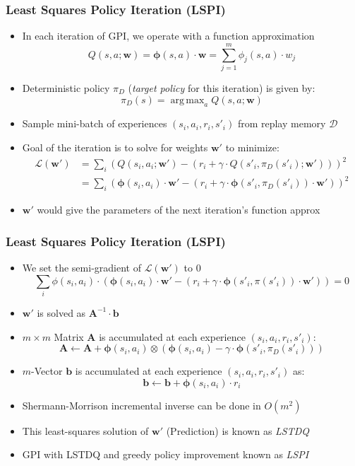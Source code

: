 \documentclass[handout]{beamer}
\DeclareMathOperator*{\argmax}{arg\,max}
\begin{document}
\begin{frame}
\frametitle{Least Squares Policy Iteration (LSPI)}
\pause
\begin{itemize}[<+->]
\item In each iteration of GPI, we operate with a function approximation
$$Q(s,a; \bm{w}) = \bm{\phi}(s,a) \cdot \bm{w} = \sum_{j=1}^m \phi_j(s,a) \cdot w_j$$
\item Deterministic policy $\pi_D$ ({\em target policy} for this iteration) is given by:
$$\pi_D(s) = \argmax_a Q(s,a; \bm{w})$$
\item Sample mini-batch of experiences $(s_i,a_i,r_i,s'_i)$ from replay memory $\mathcal{D}$
\item Goal of the iteration is to solve for weights $\bm{w}'$ to minimize:
\begin{align*}
\mathcal{L}(\bm{w}') & = \sum_i (Q(s_i,a_i; \bm{w}') - (r_i + \gamma \cdot Q(s'_i,\pi_D(s'_i); \bm{w}')))^2\\
& = \sum_i (\bm{\phi}(s_i,a_i) \cdot \bm{w}' - (r_i + \gamma \cdot \bm{\phi}(s'_i, \pi_D(s'_i)) \cdot \bm{w}'))^2
\end{align*}
\item $\bm{w}'$ would give the parameters of the next iteration's function approx
\end{itemize}
\end{frame}

\begin{frame}
\frametitle{Least Squares Policy Iteration (LSPI)}
\pause
\begin{itemize}[<+->]
\item We set the semi-gradient of $\mathcal{L}(\bm{w}')$ to 0
$$\sum_i \phi(s_i,a_i) \cdot (\bm{\phi}(s_i,a_i) \cdot \bm{w}' - (r_i + \gamma \cdot \bm{\phi}(s'_i, \pi(s'_i)) \cdot \bm{w}')) = 0$$
\item $\bm{w}'$ is solved as $\bm{A}^{-1} \cdot \bm{b}$
\item $m \times m$ Matrix $\bm{A}$ is accumulated at each experience $(s_i,a_i,r_i,s'_i)$:
$$ \bm{A} \leftarrow \bm{A} + \bm{\phi}(s_i, a_i) \otimes (\bm{\phi}(s_i, a_i) - \gamma \cdot \bm{\phi}(s'_i, \pi_D(s'_i))) $$
\item $m$-Vector $\bm{b}$ is accumulated at each experience $(s_i,a_i,r_i,s'_i)$ as:
$$\bm{b} \leftarrow \bm{b} + \bm{\phi}(s_i, a_i) \cdot r_i$$
\item Shermann-Morrison incremental inverse can be done in $O(m^2)$
\item This least-squares solution of $\bm{w}'$ (Prediction) is known as {\em LSTDQ}
\item GPI with LSTDQ and greedy policy improvement known as {\em LSPI}
\end{itemize}
\end{frame}
\end{document}
